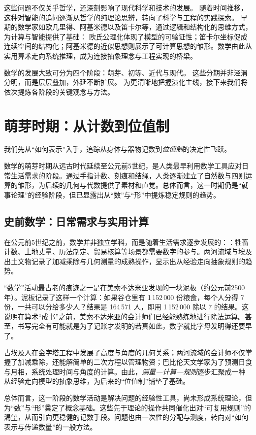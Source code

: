这些问题不仅关乎哲学，还深刻影响了现代科学和技术的发展。
随着时间推移，这种对智能的追问逐渐从哲学的纯理论思辨，转向了科学与工程的实践探索。
早期的数学家如欧几里得、阿基米德以及笛卡尔等，通过逻辑和结构化的思维方式，为计算与智能提供了基础：
欧氏公理化体现了模型的可验证性；笛卡尔坐标促成连续空间的结构化；阿基米德的近似思想则展示了可计算思想的雏形。数学由此从实用算术走向系统推理，成为连接抽象理念与工程实现的桥梁。

数学的发展大致可分为四个阶段：萌芽、初等、近代与现代。
这些分期并非泾渭分明，而是层层叠加，外延不断扩展。
为更清晰地把握演化主线，接下来我们将依次提炼各阶段的关键观念与方法。

\section{萌芽时期：从计数到位值制}

我们先从“如何表示”入手，追踪从身体与器物记数到\emph{位值制}的决定性飞跃。

数学的萌芽时期从远古时代延续至公元前5世纪，是人类最早利用数学工具应对日常生活需求的阶段。通过手指计数、刻痕和结绳，人类逐渐建立了自然数与四则运算的雏形，为后续的几何与代数提供了素材和直觉。总体而言，这一时期仍是“就事论理”的经验阶段，但已显露出从“数”与“形”中提炼稳定规则的趋势。

\subsection{史前数学：日常需求与实用计算}

在公元前5世纪之前，数学并非独立学科，而是随着生活需求逐步发展的：：牲畜计数、土地丈量、历法制定、贸易核算等场景都需要数字的参与。两河流域与埃及出土文物记录了加减乘除与几何测量的成熟操作，显示出从经验走向抽象规则的趋势。

“数学”活动最古老的痕迹之一是在美索不达米亚发现的一块泥板（约公元前2500年）。泥板记录了这样一个计算：如果谷仓里有 1\,152\,000 份粮食，每个人分得 7 份，一共可以分给多少人？结果是 164\,571 人，即用 1\,152\,000 除以 7 的结果。这说明在算术“成书”之前，美索不达米亚的会计师们已经能熟练地进行除法运算。甚至，书写完全有可能就是为了记账才发明的若真如此，数字就比字母发明得还要早了。

古埃及人在金字塔工程中发展了高度与角度的几何关系；两河流域的会计师不仅掌握了加减乘除，还能解简单的二次方程以管理物资；巴比伦天文学家为了预测日食与月相，系统处理时间与角度的计算。由此，\emph{测量—计算—规则}逐步汇聚成一种从经验走向模型的抽象思维，为后来的“位值制”铺垫了基础。

总体而言，这一阶段的数学活动是解决问题的经验性工具，尚未形成系统理论，但为“数”与“形”奠定了概念基础。这些先于理论的操作共同催化出对“可复用规则”的渴望，从而引向更稳健的记数手段。问题也由一次性的分配与测度，转向对“如何表示与传递数量”的一般方法。

